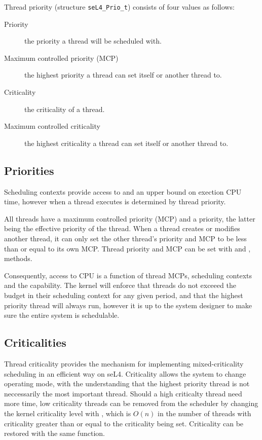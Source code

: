 Thread priority (structure \texttt{seL4\_Prio\_t}) consists of four values as follows:

\begin{description}
    \item[Priority] the priority a thread will be scheduled with.
    \item[Maximum controlled priority (MCP)] the highest priority a thread can set itself or another thread to.
    \item[Criticality] the criticality of a thread.
    \item[Maximum controlled criticality] the highest criticality a thread can set itself or another thread to. 
\end{description}

\subsection{Priorities}

Scheduling contexts provide access to and an upper bound on exection CPU time, however when a thread executes is determined by thread priority.

All threads have a maximum controlled priority (MCP) and a priority, the latter being the effective priority of the thread.
When a thread creates or modifies another thread, it can only set the
other thread's priority and MCP to be less than or equal to its own MCP. Thread priority and MCP can be
set with  and
,  methods.

Consequently, access to CPU is a function of thread MCPs, scheduling contexts and the  capability.
The kernel will enforce that threads do not exceeed the budget in their scheduling context for any given period, and that the highest priority thread will always run, however it is up to the system designer to make sure the entire system is schedulable.

\subsection{Criticalities}
\label{sec:criticality}

Thread criticality provides the mechanism for implementing mixed-criticality scheduling in an efficient way on seL4.
Criticality allows the system to change operating mode, with the understanding that the highest priority thread is not neccessarily the most important thread. 
Should a high criticalty thread need more time, low criticality threads can be removed from the scheduler by changing the kernel criticality level with , which is $O(n)$ in the number of threads with criticality greater than or equal to the criticality being set. 
Criticality can be restored with the same function. 

